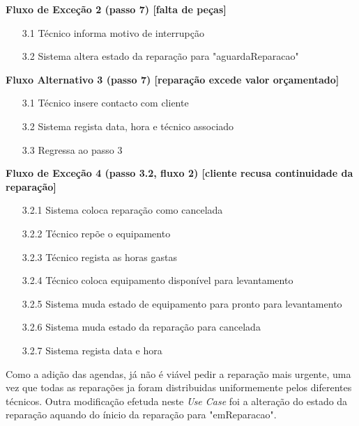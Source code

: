 \documentclass[../relatorio.tex]{subfiles}
\begin{document}
\begin{itemize}
\begin{flushleft}
              \textbf{Fluxo de Exceção 2 (passo 7) [falta de peças]}
          \end{flushleft}
          \begin{itemize}
              \item[3.1]{Técnico informa motivo de interrupção}
              \item[3.2]{Sistema altera estado da reparação para "aguardaReparacao"}
          \end{itemize}
          \begin{flushleft}
              \textbf{Fluxo Alternativo 3 (passo 7) [reparação excede valor orçamentado]}
          \end{flushleft}
          \begin{itemize}
              \item[3.1]{Técnico insere contacto com cliente}
              \item[3.2]{Sistema regista data, hora e técnico associado}
              \item[3.3]{Regressa ao passo 3}
          \end{itemize}
          \begin{flushleft}
              \textbf{Fluxo de Exceção 4 (passo 3.2, fluxo 2) [cliente recusa continuidade da reparação]}
          \end{flushleft}
          \begin{itemize}
              \item[3.2.1]{Sistema coloca reparação como cancelada}
              \item[3.2.2]{Técnico repõe o equipamento}
              \item[3.2.3]{Técnico regista as horas gastas}
              \item[3.2.4]{Técnico coloca equipamento disponível para levantamento}
              \item[3.2.5]{Sistema muda estado de equipamento para pronto para levantamento}
              \item[3.2.6]{Sistema muda estado da reparação para cancelada}
              \item[3.2.7]{Sistema regista data e hora} 
          \end{itemize}
\end{itemize}

Como a adição das agendas, já não é viável pedir a reparação mais urgente, uma vez que todas as reparações ja foram distribuidas
uniformemente pelos diferentes técnicos.
Outra modificação efetuda neste \textit{Use Case} foi a alteração do estado da reparação aquando do ínicio da reparação para "emReparacao".
\end{document}
